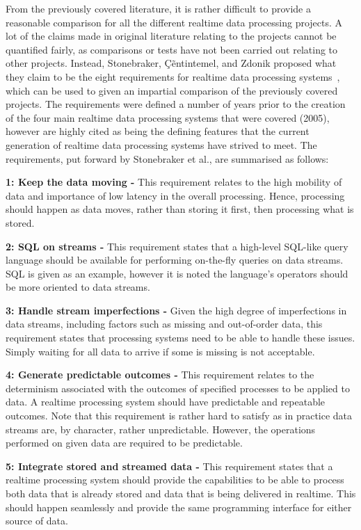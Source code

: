 From the previously covered literature, it is rather difficult to provide a reasonable comparison for all the different
realtime data processing projects. A lot of the claims made in original literature relating to the projects cannot be
quantified fairly, as comparisons or tests have not been carried out relating to other projects. Instead, Stonebraker,
\c{C}\~entintemel, and Zdonik proposed what they claim to be the eight requirements for realtime data processing systems~\cite{stonebraker_8_2005},
which can be used to given an impartial comparison of the previously covered projects. The requirements were defined a
number of years prior to the creation of the four main realtime data processing systems that were covered (2005), however are highly
cited as being the defining features that the current generation of realtime data processing systems have strived to meet.
The requirements, put forward by Stonebraker et al., are summarised as follows:

\noindent \textbf{1: Keep the data moving -} This requirement relates to the high mobility of data and importance of low
latency in the overall processing. Hence, processing should happen as data moves, rather than storing it first, then
processing what is stored.

\noindent \textbf{2: SQL on streams -} This requirement states that a high-level SQL-like query language should be
available for performing on-the-fly queries on data streams. SQL is given as an example, however it is noted the language's
operators should be more oriented to data streams.

\noindent \textbf{3: Handle stream imperfections -} Given the high degree of imperfections in data streams, including
factors such as missing and out-of-order data, this requirement states that processing systems need to be able to handle
these issues. Simply waiting for all data to arrive if some is missing is not acceptable.

\noindent \textbf{4: Generate predictable outcomes -} This requirement relates to the determinism associated with the
outcomes of specified processes to be applied to data. A realtime processing system should have predictable and repeatable
outcomes. Note that this requirement is rather hard to satisfy as in practice data streams are, by character, rather
unpredictable. However, the operations performed on given data are required to be predictable.

\noindent \textbf{5: Integrate stored and streamed data -} This requirement states that a realtime processing system
should provide the capabilities to be able to process both data that is already stored and data that is being delivered
in realtime. This should happen seamlessly and provide the same programming interface for either source of data.

